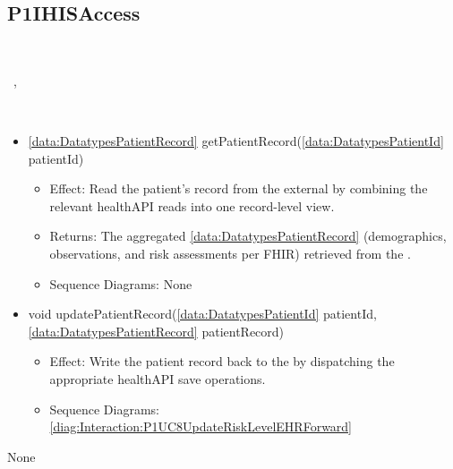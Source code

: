   \subsection{P1IHISAccess}\label{int:InterfacesP1IHISAccess}
    \begin{description}
      \item[Provided by:] \iconcomponent{}~
      \item[Required by:] \iconcomponent{}~, \iconcomponent{}~ 
      \item[Operations:] ~
    \begin{itemize}[noitemsep,nolistsep,leftmargin=-.25cm]
      \item \textsf{\ref{data:DatatypesPatientRecord} getPatientRecord(\ref{data:DatatypesPatientId} patientId)}
        \begin{itemize}[noitemsep,nolistsep]
           \item Effect: Read the patient's record from the external  by combining the relevant healthAPI reads into one record-level view. 
           \item Returns: The aggregated \ref{data:DatatypesPatientRecord} (demographics, observations, and risk assessments per FHIR) retrieved from the .
           \item Sequence Diagrams: None
        \end{itemize}
      \item \textsf{void updatePatientRecord(\ref{data:DatatypesPatientId} patientId, \ref{data:DatatypesPatientRecord} patientRecord)}
        \begin{itemize}[noitemsep,nolistsep]
           \item Effect: Write the patient record back to the  by dispatching the appropriate healthAPI save operations. 
           \item Sequence Diagrams: \cref{diag:Interaction:P1UC8UpdateRiskLevelEHRForward}
        \end{itemize}
    \end{itemize}
      \item[Diagrams:] None
    \end{description}

